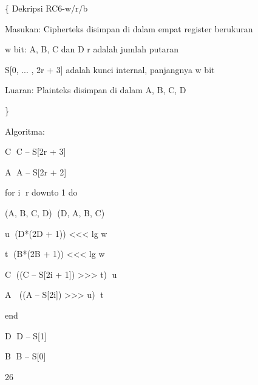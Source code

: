 \documentclass{article}
\begin{document}

\{ Dekripsi RC6-w/r/b

Masukan: Cipherteks disimpan di dalam empat register berukuran

w bit: A, B, C dan D r adalah jumlah putaran

S[0, ... , 2r + 3] adalah kunci internal, panjangnya w bit

Luaran: Plainteks disimpan di dalam A, B, C, D

\}

Algoritma:

C C – S[2r + 3]

A A – S[2r + 2]

for i r downto 1 do

(A, B, C, D) (D, A, B, C)

u (D*(2D + 1)) <<< lg w

t (B*(2B + 1)) <<< lg w

C ((C – S[2i + 1]) >>> t) u


      A  ((A – S[2i]) >>> u) t

end

D D – S[1]

B B – S[0]

26
\end{document}
